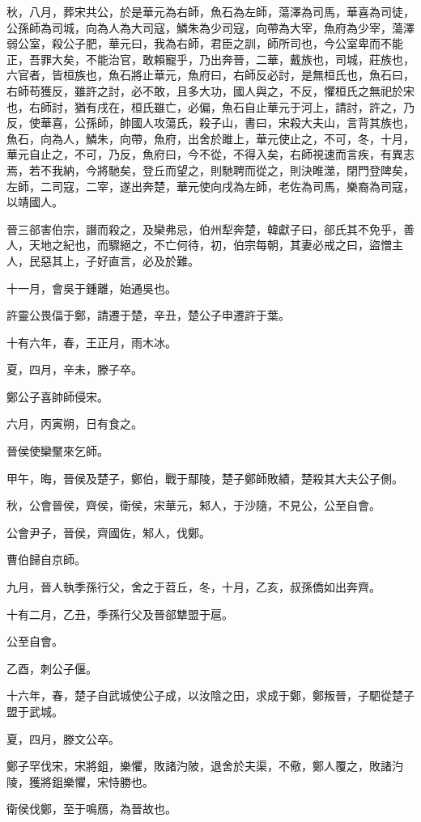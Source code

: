 \begin{pinyinscope}
秋，八月，葬宋共公，於是華元為右師，魚石為左師，蕩澤為司馬，華喜為司徒，公孫師為司城，向為人為大司寇，鱗朱為少司寇，向帶為大宰，魚府為少宰，蕩澤弱公室，殺公子肥，華元曰，我為右師，君臣之訓，師所司也，今公室卑而不能正，吾罪大矣，不能治官，敢賴寵乎，乃出奔晉，二華，戴族也，司城，莊族也，六官者，皆桓族也，魚石將止華元，魚府曰，右師反必討，是無桓氏也，魚石曰，右師苟獲反，雖許之討，必不敢，且多大功，國人與之，不反，懼桓氏之無祀於宋也，右師討，猶有戌在，桓氏雖亡，必偏，魚石自止華元于河上，請討，許之，乃反，使華喜，公孫師，帥國人攻蕩氏，殺子山，書曰，宋殺大夫山，言背其族也，魚石，向為人，鱗朱，向帶，魚府，出舍於雎上，華元使止之，不可，冬，十月，華元自止之，不可，乃反，魚府曰，今不從，不得入矣，右師視速而言疾，有異志焉，若不我納，今將馳矣，登丘而望之，則馳聘而從之，則決睢澨，閉門登陴矣，左師，二司寇，二宰，遂出奔楚，華元使向戌為左師，老佐為司馬，樂裔為司寇，以靖國人。

晉三郤害伯宗，譖而殺之，及欒弗忌，伯州犁奔楚，韓獻子曰，郤氏其不免乎，善人，天地之紀也，而驟絕之，不亡何待，初，伯宗每朝，其妻必戒之曰，盜憎主人，民惡其上，子好直言，必及於難。

十一月，會吳于鍾離，始通吳也。

許靈公畏偪于鄭，請遷于楚，辛丑，楚公子申遷許于葉。

十有六年，春，王正月，雨木冰。

夏，四月，辛未，滕子卒。

鄭公子喜帥師侵宋。

六月，丙寅朔，日有食之。

晉侯使欒黶來乞師。

甲午，晦，晉侯及楚子，鄭伯，戰于鄢陵，楚子鄭師敗績，楚殺其大夫公子側。

秋，公會晉侯，齊侯，衛侯，宋華元，邾人，于沙隨，不見公，公至自會。

公會尹子，晉侯，齊國佐，邾人，伐鄭。

曹伯歸自京師。

九月，晉人執季孫行父，舍之于苕丘，冬，十月，乙亥，叔孫僑如出奔齊。

十有二月，乙丑，季孫行父及晉郤犨盟于扈。

公至自會。

乙酉，刺公子偃。

十六年，春，楚子自武城使公子成，以汝陰之田，求成于鄭，鄭叛晉，子駟從楚子盟于武城。

夏，四月，滕文公卒。

鄭子罕伐宋，宋將鉏，樂懼，敗諸汋陂，退舍於夫渠，不儆，鄭人覆之，敗諸汋陵，獲將鉏樂懼，宋恃勝也。

衛侯伐鄭，至于鳴鴈，為晉故也。


\end{pinyinscope}
